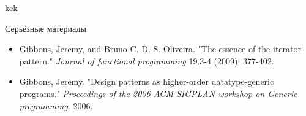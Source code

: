     \begin{frame}[fragile]{}
        kek
    \end{frame}


    \begin{frame}[fragile]{Серьёзные материалы}
        \begin{itemize}
            \item Gibbons, Jeremy, and Bruno C. D. S. Oliveira. "The essence of the iterator pattern." \textit{Journal of functional programming} 19.3-4 (2009): 377-402.
            \item Gibbons, Jeremy. "Design patterns as higher-order datatype-generic programs." \textit{Proceedings of the 2006 ACM SIGPLAN workshop on Generic programming}. 2006.
        \end{itemize}
    \end{frame}


